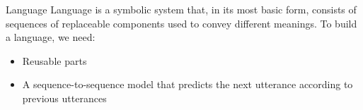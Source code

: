 \begin{frame}[allowframebreaks]{Language}
    Language is a symbolic system that, in its most basic form, consists of sequences of replaceable components used to convey different meanings. \cite{saussure-1916-course-in-general-linguistics}
    To build a language, we need:
    \begin{itemize}
        \item Reusable parts
        \item A sequence-to-sequence model that predicts the next utterance according to previous utterances
    \end{itemize}
\end{frame}